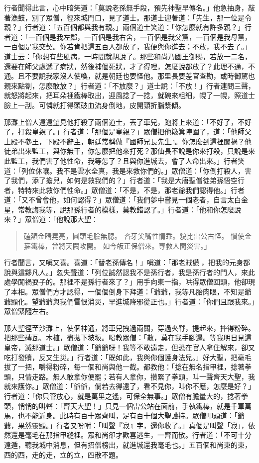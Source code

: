 行者聞得此言，心中暗笑道：「莫說老孫無手段，預先神聖早傳名。」他急抽身，敲著漁鼓，別了眾僧，徑來城門口，見了道士。那道士迎著道：「先生，那一位是令親？」行者道：「五百個都與我有親。」兩個道士笑道：「你怎麼就有許多親？」行者道：「一百個是我左鄰，一百個是我右舍，一百個是我父黨，一百個是我母黨，一百個是我交契。你若肯把這五百人都放了，我便與你進去；不放，我不去了。」道士云：「你想有些風病，一時間就胡說了。那些和尚乃國王御賜，若放一二名，還要在師父處遞了病狀，然後補個死狀，才了得哩，怎麼說都放了？此理不通，不通。且不要說我家沒人使喚，就是朝廷也要怪他。那里長要差官查勘，或時御駕也親來點劄，怎麼敢放？」行者道：「不放麼？」道士說：「不放！」行者連問三聲，就怒將起來，把耳朵裡鐵棒取出，迎風捻了一捻，就碗來粗細，幌了一幌，照道士臉上一刮。可憐就打得頭破血流身倒地，皮開頸折腦漿傾。

那灘上僧人遠遠望見他打殺了兩個道士，丟了車兒，跑將上來道：「不好了，不好了，打殺皇親了。」行者道：「那個是皇親？」眾僧把他簸箕陣圍了，道：「他師父上殿不參王，下殿不辭主，朝廷常稱做『國師兄長先生』。你怎麼到這裡闖禍？他徒弟出來監工，與你無干，你怎麼把他來打死？那仙長不說是你來打殺，只說是來此監工，我們害了他性命，我等怎了？且與你進城去，會了人命出來。」行者笑道：「列位休嚷。我不是雲水全真，我是來救你們的。」眾僧道：「你倒打殺人，害了我們，添了擔兒，如何是救我們的？」行者道：「我是大唐聖僧徒弟孫悟空行者，特特來此救你們性命。」眾僧道：「不是，不是，那老爺我們認得他。」行者道：「又不曾會他，如何認得？」眾僧道：「我們夢中嘗見一個老者，自言太白金星，常教誨我等，說那孫行者的模樣，莫教錯認了。」行者道：「他和你怎麼說來？」眾僧道：「他說那大聖：
\begin{quote}
磕額金睛晃亮，圓頭毛臉無腮。
咨牙尖嘴性情乖。貌比雷公古怪。
慣使金箍鐵棒，曾將天闕攻開。
如今皈正保僧來。專救人間災害。」
\end{quote}

行者聞言，又嗔又喜。喜道：「替老孫傳名！」嗔道：「那老賊憊𪬯，把我的元身都說與這夥凡人。」忽失聲道：「列位誠然認我不是孫行者，我是孫行者的門人，來此處學闖禍耍子的。那裡不是孫行者來了？」用手向東一指，哄得眾僧回頭，他卻現了本相。眾僧們方才認得，一個個倒身下拜道：「爺爺，我等凡胎肉眼，不知是爺爺顯化。望爺爺與我們雪恨消災，早進城降邪從正也。」行者道：「你們且跟我來。」眾僧緊隨左右。

那大聖徑至沙灘上，使個神通，將車兒拽過兩關，穿過夾脊，提起來，摔得粉碎。把那些磚瓦、木植，盡拋下坡坂。喝教眾僧：「散，莫在我手腳邊。等我明日見這皇帝，滅那道士。」眾僧道：「爺爺呀！我等不敢遠走，但恐在官人拿住解來，卻又吃打發贖，反又生災。」行者道：「既如此，我與你個護身法兒。」好大聖，把毫毛拔了一把，嚼得粉碎，每一個和尚與他一截。都教他：「捻在無名指甲裡，捻著拳頭，只情走路。無人敢拿你便罷；若有人拿你，攢緊了拳頭，叫一聲齊天大聖，我就來護你。」眾僧道：「爺爺，倘若去得遠了，看不見你，叫你不應，怎麼是好？」行者道：「你只管放心，就是萬里之遙，可保全無事。」眾僧有膽量大的，捻著拳頭，悄悄的叫聲：「齊天大聖！」只見一個雷公站在面前，手執鐵棒，就是千軍萬馬，也不能近身。此時有百十眾齊叫，足有百十個大聖護持。眾僧叩頭道：「爺爺，果然靈顯。」行者又吩咐：「叫聲『寂』字，還你收了。」真個是叫聲「寂」，依然還是毫毛在那指甲縫裡。眾和尚卻才歡喜逃生，一齊而散。行者道：「不可十分遠遁，聽我城中消息，但有招僧榜出，就進城還我毫毛也。」五百個和尚東的東，西的西，走的走，立的立，四散不題。

